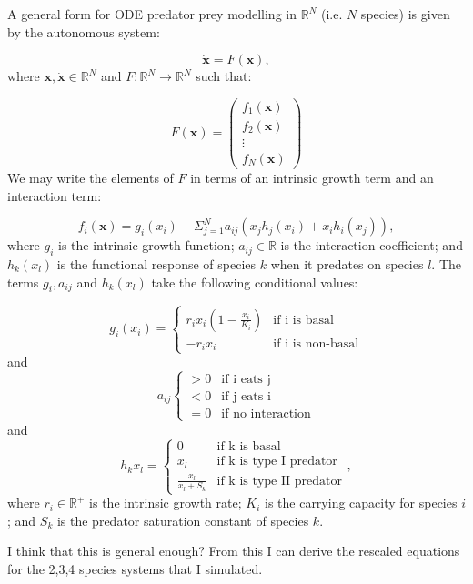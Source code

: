 \documentclass{article}
\begin{document}
A general form for ODE predator prey modelling in $\mathbb{R}^{N}$ (i.e. $N$ species) is given by the autonomous system:

\begin{equation}
\mathbf{\dot{x}} = F(\mathbf{x}), 
\end{equation}
%
where $\mathbf{x}, \mathbf{\dot{x}} \in \mathbb{R}^N$ and $F: \mathbb{R}^N \rightarrow \mathbb{R}^N$ such that:

\begin{equation}
F(\mathbf{x}) = 
\begin{pmatrix}
	f_1(\mathbf{x}) \\
	f_2(\mathbf{x}) \\
	\vdots \\
    f_N(\mathbf{x})
\end{pmatrix}
\end{equation}
%
We may write the elements of $F$ in terms of an intrinsic growth term and an interaction term:

\begin{equation}
f_i(\mathbf{x}) = g_i(x_i) + \Sigma_{j=1}^N a_{ij} \left( x_jh_j(x_i) + x_ih_i(x_j) \right),
\end{equation}
%
where $g_i$ is the intrinsic growth function; $a_{ij} \in \mathbb{R}$ is the interaction coefficient; and $h_k(x_l)$ is the functional response of species $k$ when it predates on species $l$. The terms $g_i, a_{ij}$ and $h_k(x_l)$ take the following conditional values:

\begin{equation}
g_i(x_i) =   
\begin{cases}
r_ix_i\left(1 - \frac{x_i}{K_i} \right) &\mbox{if i is basal} \\
-r_ix_i &\mbox{if i is non-basal}
\end{cases}
\end{equation}
%
and
\begin{equation}
a_{ij}  
\begin{cases}
> 0 &\mbox{if i eats j} \\
< 0 &\mbox{if j eats i} \\
= 0 &\mbox{if no interaction}
\end{cases}
\end{equation}
%
and
\begin{equation}
h_k{x_l} =  
\begin{cases}
0 &\mbox{if k is basal} \\
x_l  &\mbox{if k is type I predator} \\
\frac{x_l}{x_l + S_k} &\mbox{if k is type II predator}
\end{cases},
\end{equation}
%
where $r_i \in \mathbb{R}^+$ is the intrinsic growth rate; $K_i$ is the carrying capacity for species $i$; and $S_k$ is the predator saturation constant of species $k$.  


I think that this is general enough? From this I can derive the rescaled equations for the 2,3,4 species systems that I simulated.%
\end{document}
